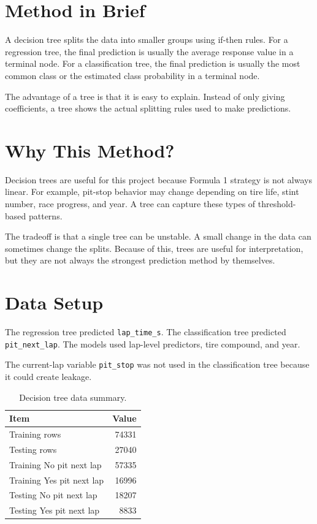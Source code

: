\documentclass[11pt,oneside,openany]{book}
\begin{document}
\section{Method in Brief}

A decision tree splits the data into smaller groups using if-then rules. For a regression tree, the final prediction is usually the average response value in a terminal node. For a classification tree, the final prediction is usually the most common class or the estimated class probability in a terminal node.

The advantage of a tree is that it is easy to explain. Instead of only giving coefficients, a tree shows the actual splitting rules used to make predictions.

\section{Why This Method?}

Decision trees are useful for this project because Formula 1 strategy is not always linear. For example, pit-stop behavior may change depending on tire life, stint number, race progress, and year. A tree can capture these types of threshold-based patterns.

The tradeoff is that a single tree can be unstable. A small change in the data can sometimes change the splits. Because of this, trees are useful for interpretation, but they are not always the strongest prediction method by themselves.

\section{Data Setup}

The regression tree predicted \texttt{lap\_time\_s}. The classification tree predicted \texttt{pit\_next\_lap}. The models used lap-level predictors, tire compound, and year.

The current-lap variable \texttt{pit\_stop} was not used in the classification tree because it could create leakage.

\begin{table}[H]
\centering
\small
\caption{Decision tree data summary.}
\begin{tabular}{lr}
\toprule
Item & Value\\
\midrule
Training rows & 74331\\
Testing rows & 27040\\
Training No pit next lap & 57335\\
Training Yes pit next lap & 16996\\
Testing No pit next lap & 18207\\
Testing Yes pit next lap & 8833\\
\bottomrule
\end{tabular}
\end{table}
\end{document}
